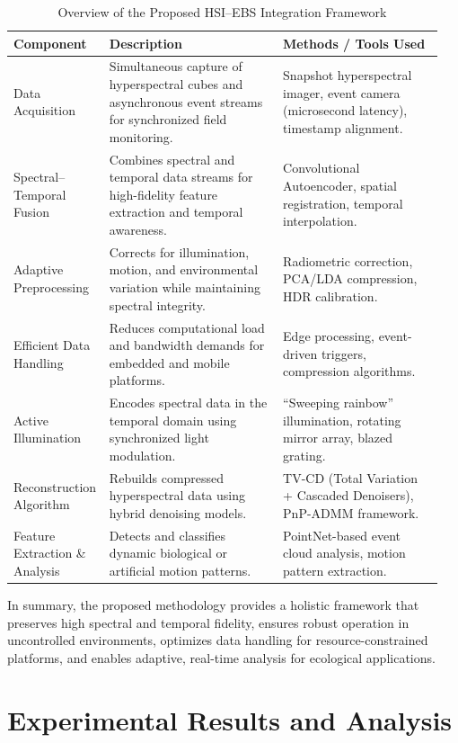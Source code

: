 \documentclass[conference]{IEEEtran}
\begin{document}
\begin{table}[t]
\caption{Overview of the Proposed HSI–EBS Integration Framework}
\label{tab:proposed_framework}
\centering
\begin{tabular}{@{}p{0.18\linewidth} p{0.40\linewidth} p{0.37\linewidth}@{}}
\toprule
\textbf{Component} & \textbf{Description} & \textbf{Methods / Tools Used} \\
\midrule
Data Acquisition & Simultaneous capture of hyperspectral cubes and asynchronous event streams for synchronized field monitoring. & Snapshot hyperspectral imager, event camera (microsecond latency), timestamp alignment. \\
Spectral–Temporal Fusion & Combines spectral and temporal data streams for high-fidelity feature extraction and temporal awareness. & Convolutional Autoencoder, spatial registration, temporal interpolation. \\
Adaptive Preprocessing & Corrects for illumination, motion, and environmental variation while maintaining spectral integrity. & Radiometric correction, PCA/LDA compression, HDR calibration. \\
Efficient Data Handling & Reduces computational load and bandwidth demands for embedded and mobile platforms. & Edge processing, event-driven triggers, compression algorithms. \\
Active Illumination & Encodes spectral data in the temporal domain using synchronized light modulation. & “Sweeping rainbow” illumination, rotating mirror array, blazed grating. \\
Reconstruction Algorithm & Rebuilds compressed hyperspectral data using hybrid denoising models. & TV-CD (Total Variation + Cascaded Denoisers), PnP-ADMM framework. \\
Feature Extraction \& Analysis & Detects and classifies dynamic biological or artificial motion patterns. & PointNet-based event cloud analysis, motion pattern extraction. \\
\bottomrule
\end{tabular}
\end{table}


In summary, the proposed methodology provides a holistic framework that preserves high spectral and temporal fidelity, ensures robust operation in uncontrolled environments, optimizes data handling for resource-constrained platforms, and enables adaptive, real-time analysis for ecological applications.


\section{Experimental Results and Analysis}
\end{document}
